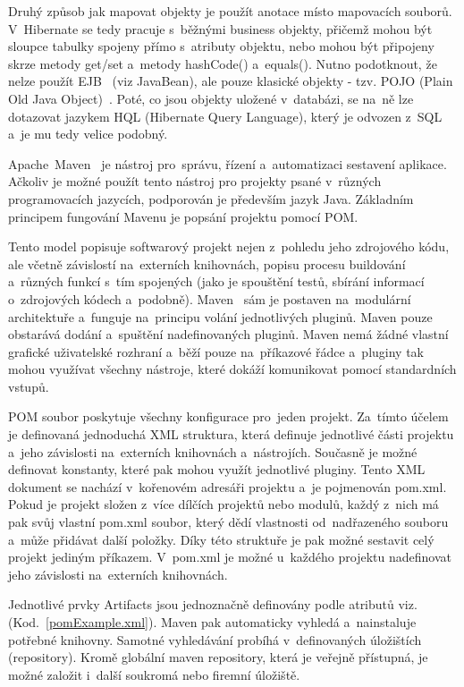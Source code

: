 Druhý způsob jak mapovat objekty je použít anotace místo mapovacích souborů. V~Hibernate se tedy pracuje s~běžnými business objekty, přičemž mohou být sloupce tabulky spojeny přímo s~atributy objektu, nebo mohou být připojeny skrze metody get/set a~metody hashCode() a~equals(). Nutno podotknout, že nelze použít EJB~\cite{enterprise-javabeans} (viz JavaBean), ale pouze klasické objekty - tzv. POJO (Plain Old Java Object)~\cite{pojo}. Poté, co jsou objekty uložené v~databázi, se na~ně lze dotazovat jazykem HQL (Hibernate Query Language), který je odvozen z~SQL~\cite{sql} a~je mu tedy velice podobný.

Apache~Maven~\cite{apache-maven} je nástroj pro~správu, řízení a~automatizaci sestavení aplikace. Ačkoliv je možné použít tento nástroj pro projekty psané v~různých programovacích jazycích, podporován je především jazyk Java. Základním principem fungování Mavenu je popsání projektu pomocí POM. 


Tento model popisuje softwarový projekt nejen z~pohledu jeho zdrojového kódu, ale včetně závislostí na~externích knihovnách, popisu procesu buildování a~různých funkcí s~tím spojených (jako je spouštění testů, sbírání informací o~zdrojových kódech a~podobně). Maven~\cite{maven-lit} sám je postaven na~modulární architektuře a~funguje na~principu volání jednotlivých pluginů. Maven pouze obstarává dodání a~spuštění nadefinovaných pluginů. Maven nemá žádné vlastní grafické uživatelské rozhraní a~běží pouze na~příkazové řádce a~pluginy tak mohou využívat všechny nástroje, které dokáží komunikovat pomocí standardních vstupů. 

POM soubor poskytuje všechny konfigurace pro~jeden projekt. Za~tímto účelem je definovaná jednoduchá XML struktura, která definuje jednotlivé části projektu a~jeho závislosti na~externích knihovnách a~nástrojích. Současně je možné definovat konstanty, které pak mohou využít jednotlivé pluginy. Tento XML dokument se nachází v~kořenovém adresáři projektu a~je pojmenován pom.xml. Pokud je projekt složen z~více dílčích projektů nebo modulů, každý z~nich má pak svůj vlastní pom.xml soubor, který dědí vlastnosti od~nadřazeného souboru a~může přidávat další položky. Díky této struktuře je pak možné sestavit celý projekt jediným příkazem. V~pom.xml je možné u~každého projektu nadefinovat jeho závislosti na~externích knihovnách.

Jednotlivé prvky Artifacts jsou jednoznačně definovány podle atributů viz. (Kod.~\ref{pomExample.xml}). Maven pak automaticky vyhledá a~nainstaluje potřebné knihovny. Samotné vyhledávání probíhá v~definovaných úložištích (repository). Kromě globální maven repository, která je veřejně přístupná, je možné založit i~další soukromá nebo firemní úložiště.

